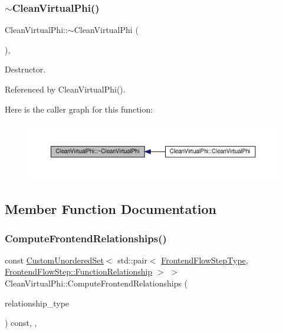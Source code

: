 \subsubsection{\texorpdfstring{$\sim$\+Clean\+Virtual\+Phi()}{~CleanVirtualPhi()}}
{\footnotesize\ttfamily Clean\+Virtual\+Phi\+::$\sim$\+Clean\+Virtual\+Phi (\begin{DoxyParamCaption}{ }\end{DoxyParamCaption})\hspace{0.3cm}{\ttfamily [override]}, {\ttfamily [default]}}



Destructor. 



Referenced by Clean\+Virtual\+Phi().

Here is the caller graph for this function\+:
\nopagebreak
\begin{figure}[H]
\begin{center}
\leavevmode
\includegraphics[width=350pt]{db/d8c/classCleanVirtualPhi_a820f799a7d098747a6f0e5f3fd623374_icgraph}
\end{center}
\end{figure}


\subsection{Member Function Documentation}
\mbox{\label{classCleanVirtualPhi_a2ea73b631ec054156c04d2da95c66f8e}} 
\subsubsection{\texorpdfstring{Compute\+Frontend\+Relationships()}{ComputeFrontendRelationships()}}
{\footnotesize\ttfamily const \hyperlink{classCustomUnorderedSet}{Custom\+Unordered\+Set}$<$ std\+::pair$<$ \hyperlink{frontend__flow__step_8hpp_afeb3716c693d2b2e4ed3e6d04c3b63bb}{Frontend\+Flow\+Step\+Type}, \hyperlink{classFrontendFlowStep_af7cf30f2023e5b99e637dc2058289ab0}{Frontend\+Flow\+Step\+::\+Function\+Relationship} $>$ $>$ Clean\+Virtual\+Phi\+::\+Compute\+Frontend\+Relationships (\begin{DoxyParamCaption}\item[{const \hyperlink{classDesignFlowStep_a723a3baf19ff2ceb77bc13e099d0b1b7}{Design\+Flow\+Step\+::\+Relationship\+Type}}]{relationship\+\_\+type }\end{DoxyParamCaption}) const\hspace{0.3cm}{\ttfamily [override]}, {\ttfamily [protected]}, {\ttfamily [virtual]}}



